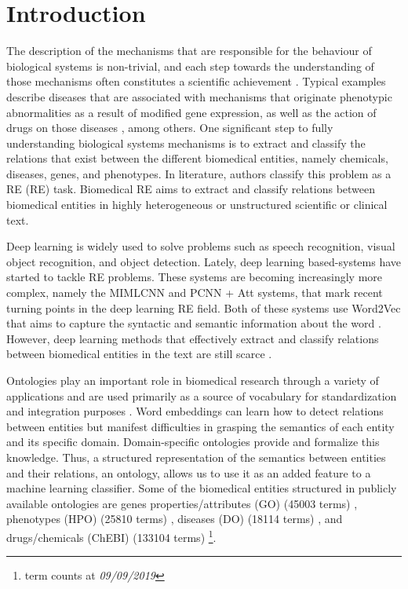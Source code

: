 \section{Introduction}

The description of the mechanisms that are responsible for the behaviour of biological systems is non-trivial, and each step towards the understanding of those mechanisms often constitutes a scientific achievement \citep{YU2006252,BECHTEL2007269}. Typical examples describe diseases that are associated with mechanisms that originate phenotypic abnormalities as a result of modified gene expression, as well as the action of drugs on those diseases \citep{Campaner2011}, among others. One significant step to fully understanding biological systems mechanisms is to extract and classify the relations that exist between the different biomedical entities, namely chemicals, diseases, genes, and phenotypes. In literature, authors classify this problem as a \acl{RE} (RE) task. Biomedical \ac{RE} aims to extract and classify relations between biomedical entities in highly heterogeneous or unstructured scientific or clinical text.

Deep learning is widely used to solve problems such as speech recognition, visual object recognition, and object detection. Lately, deep learning based-systems have started to tackle \ac{RE} problems. These systems are becoming increasingly more complex, namely the MIMLCNN \citep{jiang2016relation} and PCNN + Att \citep{lin2016neural} systems, that mark recent turning points in the deep learning \ac{RE} field. Both of these systems use Word2Vec \citep{mikolov2013distributed} that aims to capture the syntactic and semantic information about the word \citep{kumar2017survey}. However, deep learning methods that effectively extract and classify relations between biomedical entities in the text are still scarce \citep{li2017neural,lamurias2019bo}. 

Ontologies play an important role in biomedical research through a variety of applications and are used primarily as a source of vocabulary for standardization and integration purposes \citep{Bodenreider08biomedicalontologies}. Word embeddings can learn how to detect relations between entities but manifest difficulties in grasping the semantics of each entity and its specific domain. Domain-specific ontologies provide and formalize this knowledge. Thus, a structured representation of the semantics between entities and their relations, an ontology, allows us to use it as an added feature to a machine learning classifier. Some of the biomedical entities structured in publicly available ontologies are genes properties/attributes (\ac{GO}) (45003 terms) \citep{ashburner2000gene,gene2019gene}, phenotypes (\ac{HPO}) (25810 terms) \citep{kohler2017human}, diseases (\ac{DO}) (18114 terms) \citep{10.1093/nar/gky1032}, and drugs/chemicals (\ac{ChEBI}) (133104 terms) \citep{hastings2016chebi}\footnote{term counts at \textit{09/09/2019}}.  

